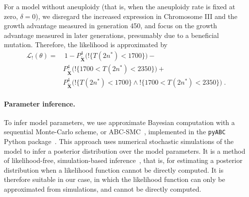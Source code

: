 \documentclass[12pt]{extarticle}
\let\vec\mathbf
\newcommand{\likelihood}{\mathcal{L}}
\begin{document}
For a model without aneuploidy (that is, when the aneuploidy rate is fixed at zero, $\delta=0$), we disregard the increased expression in Chromosome III and the growth advantage measured in generation 450, and focus on the growth advantage measured in later generations, presumably due to a beneficial mutation. 
Therefore, the likelihood is approximated by
\begin{equation}\begin{aligned}
\label{eq:heatstress-noaneuploidy-likelihood}
\likelihood_{!}(\theta) = &\ 
	1 - 
	P_{\tilde{\vec X}}^4\big(!\{T(2n^*)<1700\}\big) - \\
&	P_{\tilde{\vec X}}^4\big(!\{1700 < T(2n^*) < 2350\}\big) + \\
&	P_{\tilde{\vec X}}^4\big(!\{T(2n^*)<1700\} \land !\{1700 < T(2n^*) < 2350\}\big)
\;.
\end{aligned}\end{equation}

\paragraph{Parameter inference.} To infer model parameters, we use approximate Bayesian computation with a sequential Monte-Carlo scheme, or ABC-SMC~\citep{Sisson2009}, implemented in the \texttt{pyABC} Python package~\citep[\href{https://pyabc.readthedocs.io}{pyabc.readthedocs.io}]{Klinger2018}.
This approach uses numerical stochastic simulations of the model to infer a posterior distribution over the model parameters. It is a method of likelihood-free, simulation-based inference~\citep{Cranmer2020}, that is, for estimating a posterior distribution when a likelihood function cannot be directly computed. It is therefore suitable in our case, in which the likelihood function can only be approximated from simulations, and cannot be directly computed. 
\end{document}
